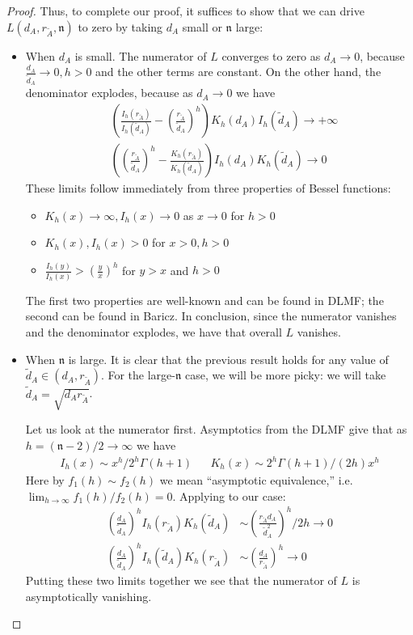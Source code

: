 \documentclass[english, aip, jcp, priprint, graphicx,floatfix]{revtex4-1}
\theoremstyle{plain}
\theoremstyle{definition}
\theoremstyle{plain}
\newcommand{\dimension}{{\mathfrak{n}}}
\begin{document}
\begin{proof}
Thus, to complete our proof, it suffices to show that we can drive $L(d_A,r_{\tilde A},\dimension)$ to zero by taking $d_A$ small or $\dimension$ large:
\begin{itemize}
    \item When $d_A$ is small.  The numerator of $L$ converges to zero as $d_A\rightarrow 0$, because $\frac{d_A}{\tilde{d}_A}\rightarrow 0,h>0$ and the other terms are constant.  On the other hand, the denominator explodes, because as $d_A\rightarrow0$ we have
    \begin{align*}
    & \left( \frac{I_h ( r_{\tilde{A}})}{I_h ( \tilde{d}_A)} - \left(\frac{r_{\tilde{A}}}{\tilde{d}_A} \right)^h  \right)
                K_h ( d_A) I_h ( \tilde{d}_A) \rightarrow +\infty \\
    & \left( \left( \frac{r_{\tilde{A}}}{\tilde{d}_A}\right)^h  - \frac{K_h ( r_{\tilde{A}})}{K_h ( \tilde{d}_A)} \right) 
                I_h (d_A)K_h ( \tilde{d}_A)\rightarrow 0
    \end{align*}
    These limits follow immediately from three properties of Bessel functions:
    \begin{itemize}
        \item $K_h(x)\rightarrow \infty,I_h(x)\rightarrow 0$ as $x\rightarrow 0$ for $h>0$
        \item $K_h(x),I_h(x)>0$ for $x>0,h>0$
        \item $\frac{I_{h}(y)}{I_{h}(x)} > \left(\frac{y}{x}\right)^{h}$ for $y>x$ and $h>0$
    \end{itemize} 
    The first two properties are well-known and can be found in DLMF\cite{noauthor_undated-ti}; the second can be found in Baricz.\cite{noauthor_undated-ti,baricz2010bounds}  In conclusion, since the numerator vanishes and the denominator explodes, we have that overall $L$ vanishes.  
    \item When $\dimension$ is large.  It is clear that the previous result holds for any value of $\tilde d_A\in (d_A, r_{\tilde A})$.  For the large-$\dimension$ case, we will be more picky: we will take $\tilde d_A=\sqrt{d_A r_{\tilde A}}$.  

    Let us look at the numerator first.  Asymptotics from the DLMF give that as $h=(\dimension-2)/2 \rightarrow \infty$ we have
    \begin{align*}
    I_h(x) \sim x^h/2^h\Gamma(h+1) & & K_h(x) \sim 2^h\Gamma(h+1)/(2h)x^h  
    \end{align*}
    Here by $f_1(h)\sim f_2(h)$ we mean ``asymptotic equivalence,'' i.e.\ $\lim_{h\rightarrow\infty}f_1(h)/f_2(h)=0$.    Applying to our case:
    \begin{align*}
        \left(\frac{d_A}{\tilde{d}_A}\right)^h I_h (r_{\tilde{A}}) K_h ( \tilde{d}_A) &
                \sim \left(\frac{r_{\tilde{A}} d_A}{\tilde{d}_A^2}\right)^h/2h \rightarrow 0 \\
        \left(\frac{d_A}{\tilde{d}_A}\right)^h I_h ( \tilde{d}_A) K_h (r_{\tilde{A}}) &
                \sim \left(\frac{ d_A}{r_{\tilde A}}\right)^h \rightarrow 0
    \end{align*}
    Putting these two limits together we see that the numerator of $L$ is asymptotically vanishing.


\end{itemize}
\end{proof}
\end{document}
